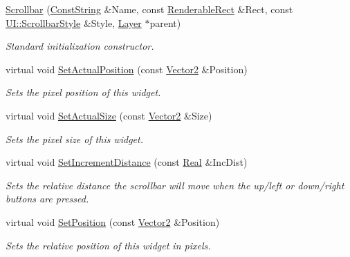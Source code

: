 \begin{DoxyCompactItemize}
\hyperlink{classMezzanine_1_1UI_1_1Scrollbar_a7abd0409147721d1557d20756496baa8}{Scrollbar} (\hyperlink{namespaceMezzanine_a63cd699ac54b73953f35ec9cfc05e506}{ConstString} \&Name, const \hyperlink{structMezzanine_1_1UI_1_1RenderableRect}{RenderableRect} \&Rect, const \hyperlink{namespaceMezzanine_1_1UI_a5998a9bf372a7e92605c0c461736e763}{UI::ScrollbarStyle} \&Style, \hyperlink{classMezzanine_1_1UI_1_1Layer}{Layer} $\ast$parent)
\begin{DoxyCompactList}\small\item\em Standard initialization constructor. \item\end{DoxyCompactList}\item 
virtual void \hyperlink{classMezzanine_1_1UI_1_1Scrollbar_a24034754316c9bc241e07fe4acbf6a62}{SetActualPosition} (const \hyperlink{classMezzanine_1_1Vector2}{Vector2} \&Position)
\begin{DoxyCompactList}\small\item\em Sets the pixel position of this widget. \item\end{DoxyCompactList}\item 
virtual void \hyperlink{classMezzanine_1_1UI_1_1Scrollbar_ac026591a6a40d0d6e0bf4c321dc57628}{SetActualSize} (const \hyperlink{classMezzanine_1_1Vector2}{Vector2} \&Size)
\begin{DoxyCompactList}\small\item\em Sets the pixel size of this widget. \item\end{DoxyCompactList}\item 
virtual void \hyperlink{classMezzanine_1_1UI_1_1Scrollbar_a8e9d746ac93dc3e6e03e8853f362c2bb}{SetIncrementDistance} (const \hyperlink{namespaceMezzanine_a726731b1a7df72bf3583e4a97282c6f6}{Real} \&IncDist)
\begin{DoxyCompactList}\small\item\em Sets the relative distance the scrollbar will move when the up/left or down/right buttons are pressed. \item\end{DoxyCompactList}\item 
virtual void \hyperlink{classMezzanine_1_1UI_1_1Scrollbar_a7c0f281e287500a52a735ded33d71fa6}{SetPosition} (const \hyperlink{classMezzanine_1_1Vector2}{Vector2} \&Position)
\begin{DoxyCompactList}\small\item\em Sets the relative position of this widget in pixels. \item\end{DoxyCompactList}\item 

\end{DoxyCompactItemize}
